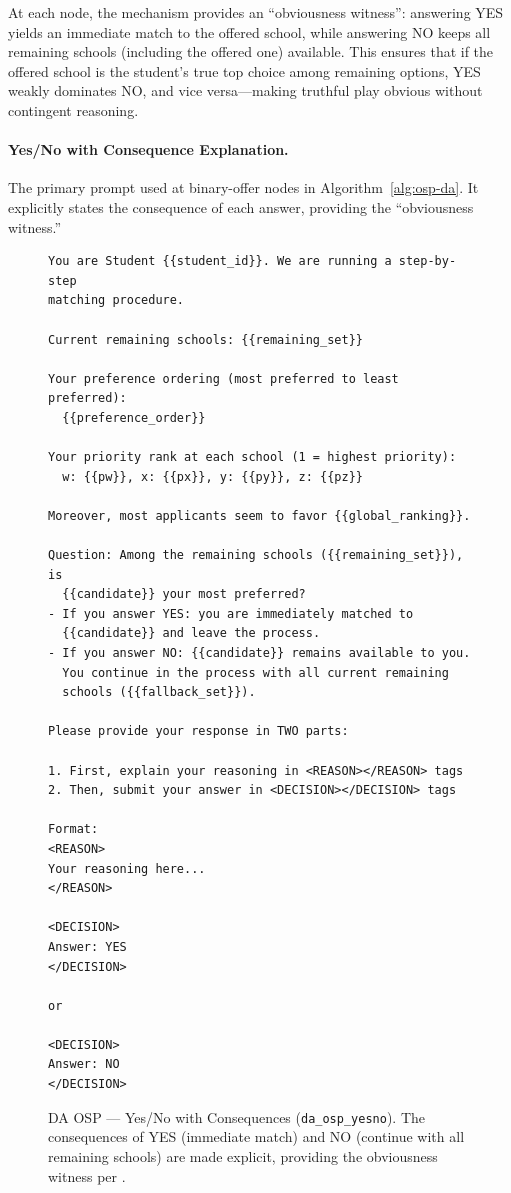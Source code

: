 At each node, the mechanism provides an ``obviousness witness'': answering YES yields an immediate match to the offered school, while answering NO keeps all remaining schools (including the offered one) available. This ensures that if the offered school is the student's true top choice among remaining options, YES weakly dominates NO, and vice versa---making truthful play obvious without contingent reasoning.


\paragraph{Yes/No with Consequence Explanation.}
The primary prompt used at binary-offer nodes in Algorithm~\ref{alg:osp-da}. It explicitly states the consequence of each answer, providing the ``obviousness witness.''

\begin{figure}[H]
\begin{lstlisting}
You are Student {{student_id}}. We are running a step-by-step
matching procedure.

Current remaining schools: {{remaining_set}}

Your preference ordering (most preferred to least preferred):
  {{preference_order}}

Your priority rank at each school (1 = highest priority):
  w: {{pw}}, x: {{px}}, y: {{py}}, z: {{pz}}

Moreover, most applicants seem to favor {{global_ranking}}.

Question: Among the remaining schools ({{remaining_set}}), is
  {{candidate}} your most preferred?
- If you answer YES: you are immediately matched to
  {{candidate}} and leave the process.
- If you answer NO: {{candidate}} remains available to you.
  You continue in the process with all current remaining
  schools ({{fallback_set}}).

Please provide your response in TWO parts:

1. First, explain your reasoning in <REASON></REASON> tags
2. Then, submit your answer in <DECISION></DECISION> tags

Format:
<REASON>
Your reasoning here...
</REASON>

<DECISION>
Answer: YES
</DECISION>

or

<DECISION>
Answer: NO
</DECISION>
\end{lstlisting}
\caption{DA OSP --- Yes/No with Consequences (\texttt{da\_osp\_yesno}). The consequences of YES (immediate match) and NO (continue with all remaining schools) are made explicit, providing the obviousness witness per \citet{ashlagi2018stable}.}
\label{fig:da-osp-yesno-guaranteed}
\end{figure}


